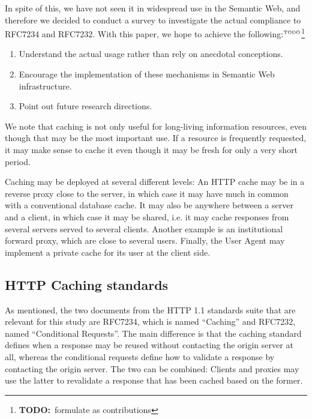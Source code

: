 \documentclass{llncs}
\newcommand{\todo}[1]{\ensuremath{^{\textrm{\tiny{TODO}\normalsize}}}\footnote{\textbf{TODO:}~#1}}
\begin{document}
In spite of this, we have not seen it in widespread use in the
Semantic Web, and therefore we decided to conduct a survey to
investigate the actual compliance to RFC7234 and RFC7232. 
With this paper, we hope to achieve the following:\todo{formulate as contributions}
\begin{enumerate}
\item Understand the actual usage rather than rely on anecdotal
  conceptions.
\item Encourage the implementation of these mechanisms in Semantic Web
  infrastructure.
\item Point out future research directions.
\end{enumerate}

We note that caching is not only useful for long-living information
resources, even though that may be the most important use. If a resource
is frequently requested, it may make sense to cache it even though it
may be fresh for only a very short period.

Caching may be deployed at several different levels: An HTTP cache may
be in a reverse proxy close to the server, in which case it may have
much in common with a conventional database cache. It may also be
anywhere between a server and a client, in which case it may be
shared, i.e. it may cache responses from several servers served to
several clients. Another example is an institutional forward proxy,
which are close to several users. Finally, the User Agent may
implement a private cache for its user at the client side.

\subsection{HTTP Caching standards}

As mentioned, the two documents from the HTTP 1.1 standards suite that
are relevant for this study are RFC7234, which is named ``Caching''
and RFC7232, named ``Conditional Requests''. The main difference is
that the caching standard defines when a response may be reused
without contacting the origin server at all, whereas the conditional
requests define how to validate a response by contacting the origin
server. The two can be combined: Clients and proxies may use the
latter to revalidate a response that has been cached based on the
former.
\end{document}
